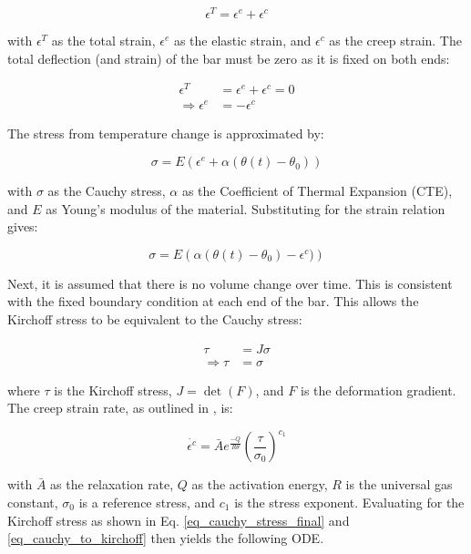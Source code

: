 \documentclass[conf]{new-aiaa}
\begin{document}
\begin{equation}
\epsilon^T = \epsilon^e + \epsilon^c
\end{equation}

\noindent
with $\epsilon^T$ as the total strain,
$\epsilon^e$ as the elastic strain,
and
$\epsilon^c$ as the creep strain.
The total deflection (and strain) of the bar must be zero as it 
is fixed on both ends:

\begin{align}
\epsilon^T &= \epsilon^e + \epsilon^c = 0 \\
\Rightarrow
  \epsilon^e &= -\epsilon^c 
\end{align}

The stress from temperature change is approximated by:

\begin{equation}
\sigma = E \left( \epsilon^e + \alpha (\theta(t) - \theta_0) \right)
\end{equation}

\noindent
with $\sigma$ as the Cauchy stress, 
$\alpha$ as the Coefficient of Thermal Expansion (CTE),
and 
$E$ as Young's modulus of the material.
Substituting for the strain relation gives:

\begin{equation}
\sigma = E \left( \alpha (\theta(t) - \theta_0) - \epsilon^c) \right) 
\label{eq_cauchy_stress_final}
\end{equation}

Next, it is assumed that there is no volume change over time.
This is consistent with the fixed boundary condition at 
each end of the bar.
This allows the Kirchoff stress to be equivalent to the Cauchy stress:

\begin{align}
\tau &= J \sigma \\
\Rightarrow
  \tau &= \sigma \label{eq_cauchy_to_kirchoff}
\end{align}

\noindent
where $\tau$ is the Kirchoff stress,
$J=\det(F)$,
and $F$ is the deformation gradient.
The creep strain rate, as outlined in 
\cite{ li_simulation_of_finite_strain_inelastic_phenomena_governed_by_creep_and_plasticity},
is:

\begin{equation}
\dot{\epsilon^c} = \bar{A} e^{\frac{-Q}{R \theta}} \left( \frac{\tau}{\sigma_0} \right)^{c_1}
\end{equation}

\noindent
with $\bar{A}$ as the relaxation rate,
$Q$ as the activation energy,
$R$ is the universal gas constant,
$\sigma_0$ is a reference stress,
and
$c_1$ is the stress exponent.
Evaluating for the Kirchoff stress as shown in Eq. \ref{eq_cauchy_stress_final} and \ref{eq_cauchy_to_kirchoff}
then yields the following ODE.
\end{document}
